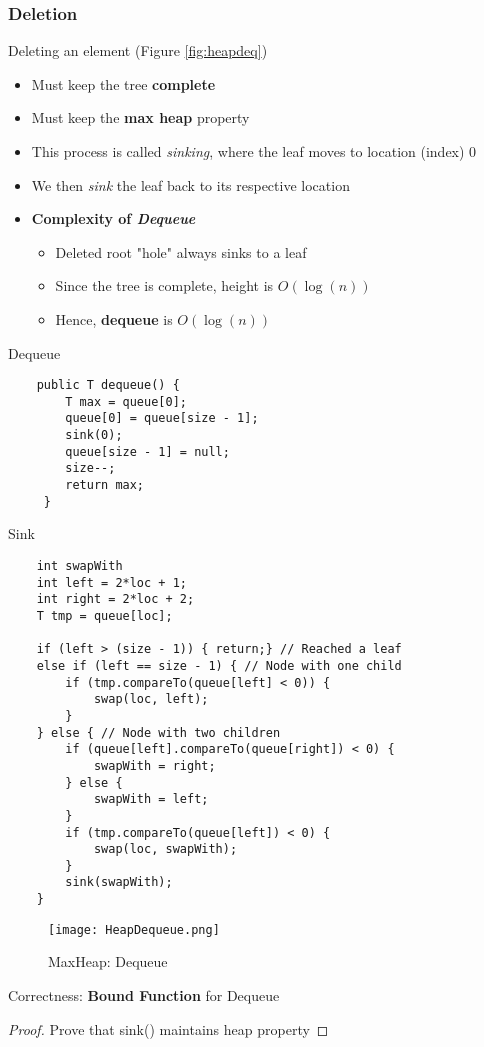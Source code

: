 \documentclass[10pt, 
a4paper, 
oneside, 
headinclude, footinclude, 
BCOR5mm]
{scrartcl}
\begin{document}
\subsubsection{Deletion}
\begin{definition}
    Deleting an element (Figure \vref{fig:heapdeq})
    \begin{itemize}
        \item Must keep the tree \textbf{complete}
        \item Must keep the \textbf{max heap} property 
        \item This process is called \textit{sinking}, where the leaf moves to location (index) 0
        \item We then \textit{sink} the leaf back to its respective location
        \item \textbf{Complexity of \textit{Dequeue}}
        \begin{itemize}
            \item Deleted root "hole" always sinks to a leaf
            \item Since the tree is complete, height is $O(\log(n))$
            \item Hence, \textbf{dequeue} is $O(\log(n))$
        \end{itemize}
    \end{itemize}
\end{definition}
Dequeue
\begin{lstlisting}
    public T dequeue() {
        T max = queue[0];
        queue[0] = queue[size - 1];
        sink(0);
        queue[size - 1] = null;
        size--;
        return max;
     }
\end{lstlisting}
Sink
\begin{lstlisting}
    int swapWith
    int left = 2*loc + 1;
    int right = 2*loc + 2;
    T tmp = queue[loc];

    if (left > (size - 1)) { return;} // Reached a leaf
    else if (left == size - 1) { // Node with one child
        if (tmp.compareTo(queue[left] < 0)) {
            swap(loc, left);
        }
    } else { // Node with two children
        if (queue[left].compareTo(queue[right]) < 0) {
            swapWith = right;
        } else {
            swapWith = left;
        } 
        if (tmp.compareTo(queue[left]) < 0) {
            swap(loc, swapWith);
        }
        sink(swapWith);
    }
\end{lstlisting}
\begin{figure}[H]
    \begin{center}
        \texttt{[image: HeapDequeue.png]}
        \caption{MaxHeap: Dequeue}
        \label{fig:heapdeq}
    \end{center}
\end{figure}
Correctness: \textbf{Bound Function} for Dequeue
\begin{proof}
    Prove that sink() maintains heap property
\end{proof}
\end{document}
